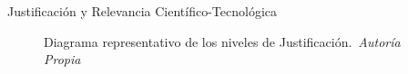 \begin{frame}{Justificación y Relevancia Científico-Tecnológica}
    \vspace{-0.15cm}
    \begin{figure}[H]
        \centering
        \vspace{-0.25cm}
        \caption{\tiny Diagrama representativo de los niveles de Justificación.~\textit{Autoría Propia}}%
        \label{fig:justification_diagram}
    \end{figure}
\end{frame}